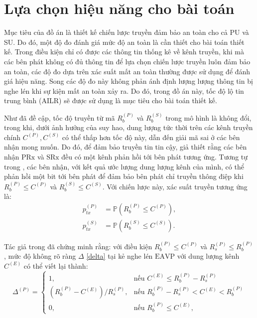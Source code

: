 \documentclass[../main.tex]{subfiles}
\begin{document}
\section{Lựa chọn hiệu năng cho bài toán}

Mục tiêu của đồ án là thiết kế chiến lược truyền đảm bảo an toàn cho cả PU và SU. Do đó, một độ đo đánh giá mức độ an toàn là cần thiết cho bài toán thiết kế. Trong điều kiện chỉ có được các thông tin thống kê về kênh truyền, khi mà các bên phát không có đủ thông tin để lựa chọn chiến lược truyền luôn đảm bảo an toàn, các độ đo dựa trên xác suất mất an toàn thường được sử dụng để đánh giá hiệu năng. Song các độ đo này không phản ánh định lượng lượng thông tin bị nghe lén khi sự kiện mất an toàn xảy ra. Do đó, trong đồ án này, tốc độ lộ tin trung bình (AILR) sẽ được sử dụng là mục tiêu cho bài toán thiết kế.

Như đã đề cập, tốc độ truyền từ mã $R_b^{(P)}$ và ${R_b^{(S)}}$ trong mô hình là không đổi, trong khi, dưới ảnh hưởng của suy hao, dung lượng tức thời trên các kênh truyền chính $C^{(P)}, C^{(S)}$ có thể thấp hơn tốc độ này, dẫn đến giải mã sai ở các bên nhận mong muốn. Do đó, để đảm bảo truyền tin tin cậy, giả thiết rằng các bên nhận $\text{PRx}$ và $\text{SRx}$ đều có một kênh phản hồi tới bên phát tương ứng. Tương tự trong \cite{zhou2011, he2016secrecy}, các bên nhận, với kết quả ước lượng dung lượng kênh của mình, có thể phản hồi một bit tới bên phát để đảm bảo bên phát chỉ truyền thông điệp khi $R_b^{(P)} \leq C^{(P)}$ và $R_b^{(S)} \leq C^{(S)}$. Với chiến lược này, xác suất truyền tương ứng là:
\begin{subequations}\label{ptx}
\begin{align}
    p_{tx}^{(P)} &= \mathbb{P}\left(R_b^{(P)} \leq C^{(P)}\right), \label{ptxp} \\
    p_{tx}^{(S)} &= \mathbb{P}\left(R_b^{(S)} \leq C^{(S)}\right). \label{ptxs}
\end{align}
\end{subequations}

Tác giả trong \cite{he2016secrecy} đã chứng minh rằng: với điều kiện $R_b^{(P)} \leq C^{(P)}$ và $R_s^{(P)} \leq R_b^{(P)}$, mức độ không rõ ràng $\Delta$ \eqref{delta} tại kẻ nghe lén $\text{EAVP}$ với dung lượng kênh $C^{(E)}$ có thể viết lại thành:
\begin{equation}\label{deltap}
\Delta^{(P)}=
\begin{cases}
1,& \text{nếu } C^{(E)}\leq R_b^{(P)} - R_s^{(P)}\\
\left(R_b^{(P)} - C^{(E)}\right)/R_s^{(P)},& \text{nếu } R_b^{(P)} - R_s^{(P)} < C^{(E)} < R_b^{(P)}\\
0 ,& \text{nếu } R_b^{(P)} \leq C^{(E)},
\end{cases}
\end{equation}
\end{document}
